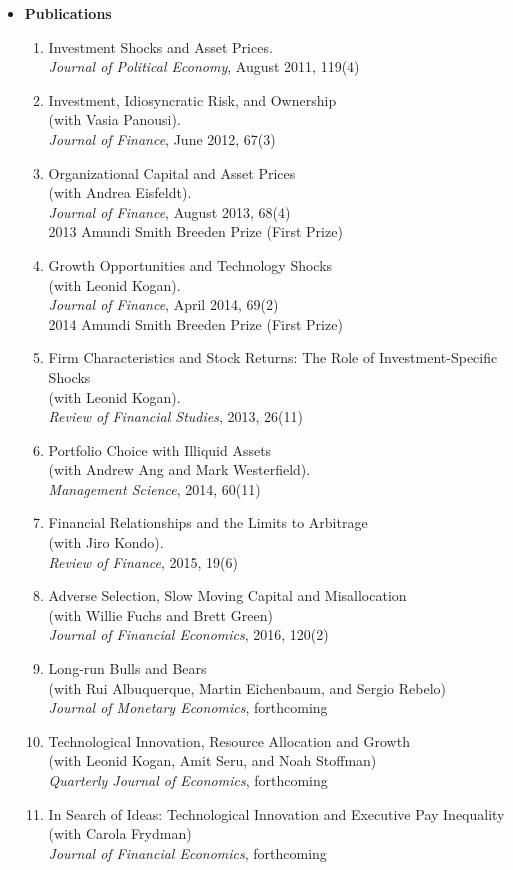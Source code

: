 \documentclass[11pt,letterpaper,serif,overlapped]{res}
\begin{document}
\begin{resume}
\begin{itemize}
\item \textbf{Publications}
\begin{enumerate}
\item Investment Shocks and Asset Prices.\\
\emph{Journal of Political Economy},  August 2011, 119(4)
\item Investment, Idiosyncratic Risk, and Ownership\\ (with Vasia Panousi).\\
\emph{Journal of Finance}, June 2012, 67(3)
\item Organizational Capital and Asset Prices\\ (with Andrea Eisfeldt).\\
\emph{Journal of Finance}, August 2013, 68(4)\\
 2013 Amundi Smith Breeden Prize (First Prize)
\item Growth Opportunities and Technology Shocks\\ (with Leonid Kogan).\\
\emph{Journal of Finance}, April 2014, 69(2)\\
 2014 Amundi Smith Breeden Prize (First Prize)
\item Firm Characteristics and Stock Returns: The Role of Investment-Specific Shocks\\ (with Leonid Kogan).\\
\emph{Review of Financial Studies}, 2013, 26(11)
\item Portfolio Choice with Illiquid Assets\\ (with Andrew Ang and Mark Westerfield).\\
\emph{Management Science},  2014, 60(11)
\item Financial Relationships and the Limits to Arbitrage\\ (with Jiro Kondo).\\
\emph{Review of Finance}, 2015, 19(6)
\item Adverse Selection, Slow Moving Capital and Misallocation\\ (with Willie Fuchs and Brett Green)\\
\emph{Journal of Financial Economics}, 2016, 120(2)
\item Long-run Bulls and Bears\\ (with Rui Albuquerque, Martin Eichenbaum, and Sergio Rebelo)\\
\emph{Journal of Monetary Economics}, forthcoming
\item Technological Innovation, Resource Allocation and Growth\\ (with Leonid Kogan, Amit Seru, and Noah Stoffman)\\
\emph{Quarterly Journal of Economics}, forthcoming
\item In Search of Ideas: Technological Innovation and Executive Pay Inequality\\ (with Carola Frydman)\\
\emph{Journal of Financial Economics}, forthcoming
\end{enumerate}


\end{itemize}
\end{resume}
\end{document}
